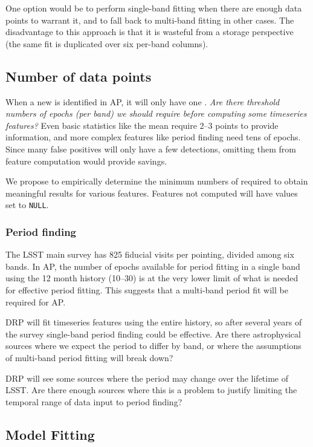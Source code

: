 \documentclass[DM,authoryear,toc]{lsstdoc}
\begin{document}
One option would be to perform single-band fitting when there are enough data points to warrant it, and to fall back to multi-band fitting in other cases.
The disadvantage to this approach is that it is wasteful from a storage perspective (the same fit is duplicated over six per-band columns).


\subsection{Number of data points}

When a new \DIAObject is identified in AP, it will only have one \DIASource.
\textit{Are there threshold numbers of epochs (per band) we should require before computing some timeseries features?}
Even basic statistics like the mean require 2--3 points to provide information, and more complex features like period finding need tens of epochs.
Since many false positives will only have a few detections, omitting them from feature computation would provide savings.

We propose to empirically determine the minimum numbers of \DIASources required to obtain meaningful results for various features.
Features not computed will have values set to \texttt{NULL}.

\subsubsection{Period finding}

The LSST main survey has 825 fiducial visits per pointing, divided among six bands.  
In AP, the number of epochs available for period fitting in a single band using the 12 month \DIASource history (10--30) is at the very lower limit of what is needed for effective period fitting.  
This suggests that a multi-band period fit will be required for AP.

DRP will fit timeseries features using the entire \DIASource history, so after several years of the survey single-band period finding could be effective.
Are there astrophysical sources where we expect the period to differ by band, or where the assumptions of multi-band period fitting will break down?

DRP will see some sources where the period may change over the lifetime of LSST.
Are there enough sources where this is a problem to justify limiting the temporal range of data input to period finding?


\subsection{Model Fitting}
\end{document}
